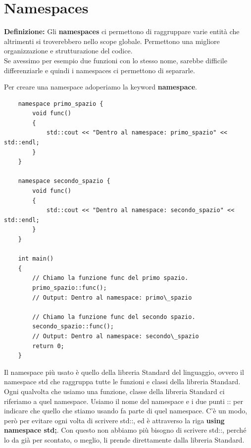 

\newpage

\section{Namespaces}

\textsf{\small \textbf{Definizione: } Gli \textbf{namespaces} ci permettono di raggruppare varie entità che altrimenti si troverebbero nello scope globale. Permettono una migliore organizzazione e strutturazione del codice.} \\

\textsf{\small Se avessimo per esempio due funzioni con lo stesso nome, sarebbe difficile differenziarle e quindi i namespaces ci permettono di separarle.}

\textsf{\small Per creare una namespace adoperiamo la keyword \textbf{namespace}.} \\

\begin{lstlisting}
	namespace primo_spazio {
		void func()
		{
			std::cout << "Dentro al namespace: primo_spazio" << std::endl;
		}
	}

	namespace secondo_spazio {
		void func()
		{
			std::cout << "Dentro al namespace: secondo_spazio" << std::endl;
		}
	}

	int main()
	{
		// Chiamo la funzione func del primo spazio.
		primo_spazio::func();
		// Output: Dentro al namespace: primo\_spazio
		
		// Chiamo la funzione func del secondo spazio.
		secondo_spazio::func();
		// Output: Dentro al namespace: secondo\_spazio
		return 0;
	}
\end{lstlisting}

\textsf{\small Il namespace più usato è quello della libreria Standard del linguaggio, ovvero il namespace std che raggruppa tutte le funzioni e classi della libreria Standard. } \\

\textsf{\small Ogni qualvolta che usiamo una funzione, classe della libreria Standard ci riferiamo a quel namespace. Usiamo il nome del namespace e i due punti :: per indicare che quello che stiamo usando fa parte di quel namespace. C'è un modo, però per evitare ogni volta di scrivere std::, ed è attraverso la riga \textbf{using namespace std;}. Con questo non abbiamo più bisogno di scrivere std::, perché lo da già per scontato, o meglio, li prende direttamente dalla libreria Standard.} \\

